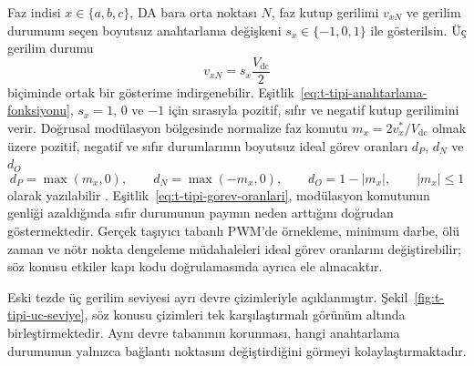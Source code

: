 Faz indisi $x\in\{a,b,c\}$, DA bara orta noktası $N$, faz kutup gerilimi $v_{xN}$ ve gerilim durumunu seçen boyutsuz anahtarlama değişkeni $s_x\in\{-1,0,1\}$ ile gösterilsin. Üç gerilim durumu
\begin{equation}
  v_{xN}=s_x\frac{V_{\mathrm{dc}}}{2}
  \label{eq:t-tipi-anahtarlama-fonksiyonu}
\end{equation}
biçiminde ortak bir gösterime indirgenebilir. Eşitlik~\eqref{eq:t-tipi-anahtarlama-fonksiyonu}, $s_x=1$, $0$ ve $-1$ için sırasıyla pozitif, sıfır ve negatif kutup gerilimini verir. Doğrusal modülasyon bölgesinde normalize faz komutu $m_x=2v_x^{\ast}/V_{\mathrm{dc}}$ olmak üzere pozitif, negatif ve sıfır durumlarının boyutsuz ideal görev oranları $d_P$, $d_N$ ve $d_O$
\begin{equation}
  d_P=\max(m_x,0),\qquad
  d_N=\max(-m_x,0),\qquad
  d_O=1-|m_x|,\qquad |m_x|\leq 1
  \label{eq:t-tipi-gorev-oranlari}
\end{equation}
olarak yazılabilir \citep{Holmes2003,Wang2020}. Eşitlik~\ref{eq:t-tipi-gorev-oranlari}, modülasyon komutunun genliği azaldığında sıfır durumunun payının neden arttığını doğrudan göstermektedir. Gerçek taşıyıcı tabanlı PWM'de örnekleme, minimum darbe, ölü zaman ve nötr nokta dengeleme müdahaleleri ideal görev oranlarını değiştirebilir; söz konusu etkiler kapı kodu doğrulamasında ayrıca ele alınacaktır.

Eski tezde üç gerilim seviyesi ayrı devre çizimleriyle açıklanmıştır. Şekil~\ref{fig:t-tipi-uc-seviye}, söz konusu çizimleri tek karşılaştırmalı görünüm altında birleştirmektedir. Aynı devre tabanının korunması, hangi anahtarlama durumunun yalnızca bağlantı noktasını değiştirdiğini görmeyi kolaylaştırmaktadır.

